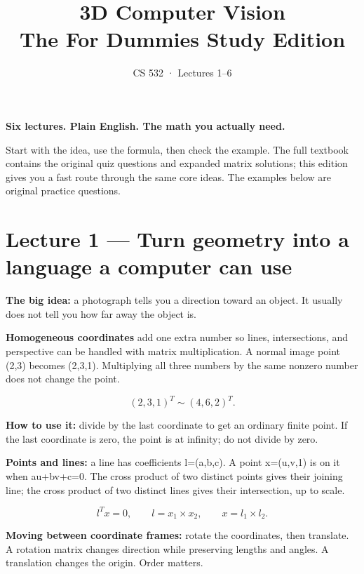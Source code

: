 \documentclass[11pt,letterpaper]{article}
\title{3D Computer Vision\\\large The For Dummies Study Edition}
\author{CS 532 · Lectures 1–6}\date{}
\begin{document}
\maketitle


\textbf{Six lectures. Plain English. The math you actually need.}



Start with the idea, use the formula, then check the example. The full textbook contains the original quiz questions and expanded matrix solutions; this edition gives you a fast route through the same core ideas. The examples below are original practice questions.



\section*{Lecture 1 — Turn geometry into a language a computer can use}


\textbf{The big idea:} a photograph tells you a direction toward an object. It usually does not tell you how far away the object is.



\textbf{Homogeneous coordinates} add one extra number so lines, intersections, and perspective can be handled with matrix multiplication. A normal image point (2,3) becomes (2,3,1). Multiplying all three numbers by the same nonzero number does not change the point.



\begin{tcolorbox}\color{MathBlue}\[(2,3,1)^T \sim (4,6,2)^T.\]\end{tcolorbox}


\textbf{How to use it:} divide by the last coordinate to get an ordinary finite point. If the last coordinate is zero, the point is at infinity; do not divide by zero.



\textbf{Points and lines:} a line has coefficients l=(a,b,c). A point x=(u,v,1) is on it when au+bv+c=0. The cross product of two distinct points gives their joining line; the cross product of two distinct lines gives their intersection, up to scale.



\begin{tcolorbox}\color{MathBlue}\[l^T x=0, \qquad l=x_1\times x_2, \qquad x=l_1\times l_2.\]\end{tcolorbox}


\textbf{Moving between coordinate frames:} rotate the coordinates, then translate. A rotation matrix changes direction while preserving lengths and angles. A translation changes the origin. Order matters.
\end{document}
